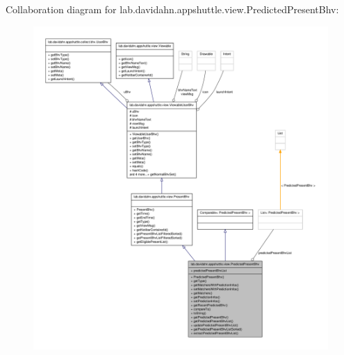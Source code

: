 \-Collaboration diagram for lab.\-davidahn.\-appshuttle.\-view.\-Predicted\-Present\-Bhv\-:
\nopagebreak
\begin{figure}[H]
\begin{center}
\leavevmode
\includegraphics[width=350pt]{classlab_1_1davidahn_1_1appshuttle_1_1view_1_1_predicted_present_bhv__coll__graph}
\end{center}
\end{figure}
